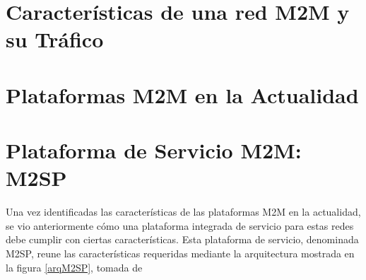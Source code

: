 \documentclass[journal]{IEEEtran}
\begin{document}
%



\section{Características de una red M2M y su Tráfico}
\section{Plataformas M2M en la Actualidad}
\section{Plataforma de Servicio M2M: M2SP}

Una vez identificadas las características de las plataformas M2M en la actualidad, se vio anteriormente cómo una plataforma integrada de servicio para estas redes debe cumplir con ciertas características. Esta plataforma de servicio, denominada M2SP, reune las características requeridas mediante la arquitectura mostrada en la figura \ref{arqM2SP}, tomada de \cite{paper1} 
\end{document}
